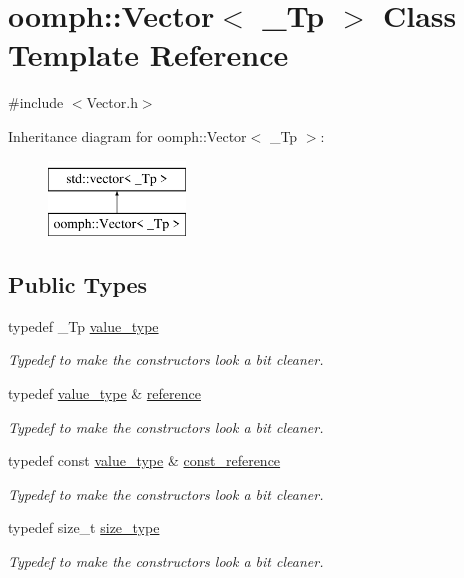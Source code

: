 \hypertarget{classoomph_1_1Vector}{}\section{oomph\+:\+:Vector$<$ \+\_\+\+Tp $>$ Class Template Reference}
\label{classoomph_1_1Vector}


{\ttfamily \#include $<$Vector.\+h$>$}

Inheritance diagram for oomph\+:\+:Vector$<$ \+\_\+\+Tp $>$\+:\begin{figure}[H]
\begin{center}
\leavevmode
\includegraphics[height=2.000000cm]{classoomph_1_1Vector}
\end{center}
\end{figure}
\subsection*{Public Types}
\begin{DoxyCompactItemize}
\item 
typedef \+\_\+\+Tp \hyperlink{classoomph_1_1Vector_a73b0fda236ce64119befbeb30111f0b2}{value\+\_\+type}
\begin{DoxyCompactList}\small\item\em Typedef to make the constructors look a bit cleaner. \end{DoxyCompactList}\item 
typedef \hyperlink{classoomph_1_1Vector_a73b0fda236ce64119befbeb30111f0b2}{value\+\_\+type} \& \hyperlink{classoomph_1_1Vector_a7bd8c89b884168f3ecc358acc501d356}{reference}
\begin{DoxyCompactList}\small\item\em Typedef to make the constructors look a bit cleaner. \end{DoxyCompactList}\item 
typedef const \hyperlink{classoomph_1_1Vector_a73b0fda236ce64119befbeb30111f0b2}{value\+\_\+type} \& \hyperlink{classoomph_1_1Vector_ad126afbb3b115ef9dce224cf33c71428}{const\+\_\+reference}
\begin{DoxyCompactList}\small\item\em Typedef to make the constructors look a bit cleaner. \end{DoxyCompactList}\item 
typedef size\+\_\+t \hyperlink{classoomph_1_1Vector_a8ad2a43bd51f6bf2a981dd4e4e4247f5}{size\+\_\+type}
\begin{DoxyCompactList}\small\item\em Typedef to make the constructors look a bit cleaner. \end{DoxyCompactList}\end{DoxyCompactItemize}
